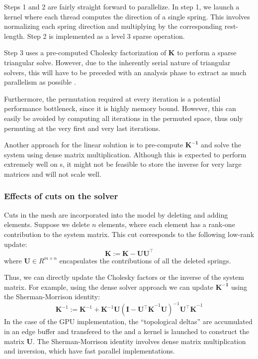 Steps 1 and 2 are fairly straight forward to parallelize. In step 1, we launch a kernel where each thread computes the direction of a single spring. This involves normalizing each spring direction and multiplying by the corresponding rest-length. Step 2 is implemented as a level 3 sparse  operation.

Step 3 uses a pre-computed Cholesky factorization of $\mathbf{K}$ to perform a sparse triangular solve. However, due to the inherently serial nature of triangular solvers, this will have to be preceded with an analysis phase to extract as much parallelism as possible \autocite{Mayer09}.

Furthermore, the permutation required at every iteration is a potential performance bottleneck, since it is highly memory bound. However, this can easily be avoided by computing all iterations in the permuted space, thus only permuting at the very first and very last iterations.

Another approach for the linear solution is to pre-compute $\mathbf{K^{-1}}$ and solve the system using dense matrix multiplication. Although this is expected to perform extremely well on s, it might not be feasible to store the inverse for very large matrices and will not scale well.

\subsubsection{Effects of cuts on the solver}
Cuts in the mesh are incorporated into the model by deleting and adding elements. Suppose we delete $n$ elements, where each element has a rank-one contribution to the system matrix. This cut corresponds to the following low-rank update:
\begin{equation}
  \mathbf{K}:=
  \mathbf{K} - \mathbf{U}\mathbf{U^\intercal}
\end{equation}
where $\mathbf{U} \in R^{m \times n}$ encapsulates the contributions
of all the deleted springs.

Thus, we can directly update the Cholesky factors or the inverse of the
system matrix. For example, using the dense solver approach we can update
$\mathbf{K^{-1}}$ using the Sherman-Morrison identity:
\begin{equation}
  \mathbf{K}^{-1} :=
  \mathbf{K}^{-1} +
  \mathbf{K}^{-1}\mathbf{U}(\mathbf{I} - \mathbf{U^\intercal K}^{-1}\mathbf{U})^{-1}
  \mathbf{U^\intercal K}^{-1}
\end{equation}
In the case of the GPU implementation, the ``topological deltas'' are accumulated in an edge buffer and transfered to the  and a kernel is launched to construct the matrix $\mathbf{U}$. The Sherman-Morrison identity involves dense matrix multiplication and inversion, which have fast parallel implementations.


